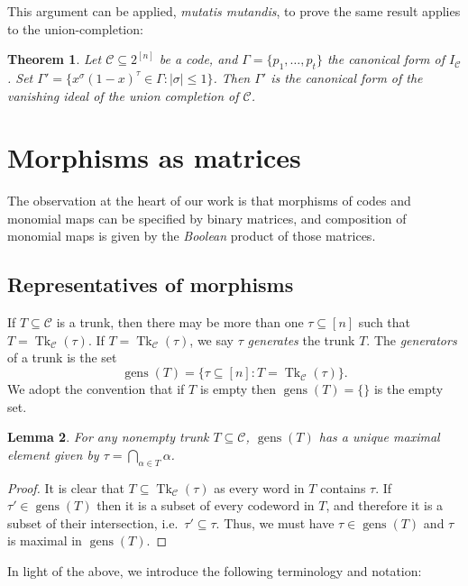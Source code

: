 \documentclass[11pt,letterpaper, reqno]{amsart}
\newtheorem{thm}{Theorem}[section]   %
\newtheorem{lem}[thm]{Lemma}         %
\theoremstyle{definition}
\DeclareMathOperator{\tk}{Tk}
\DeclareMathOperator{\gens}{gens}
\def\cC{\mathcal{C}}
\begin{document}
    This argument can be applied, \emph{mutatis mutandis}, to prove the same result applies to the union-completion:
    \begin{thm}
        Let $\cC \subseteq 2^{[n]}$ be a code, and $\Gamma = \{p_1,\dots,p_t\}$ the canonical form of $I_\cC$. Set $\Gamma' = \{x^\sigma (1-x)^\tau \in \Gamma : |\sigma| \leq 1\}$. Then $\Gamma'$ is the canonical form of the vanishing ideal of the union completion of $\cC$.
    \end{thm}

    
\section{Morphisms as matrices}\label{sec:morphismsasmatrices}
    The observation at the heart of our work is that morphisms of codes and monomial maps can be specified by binary matrices, and composition of monomial maps is given by the \emph{Boolean} product of those matrices.
    
\subsection{Representatives of morphisms}
    If $T \subseteq \cC$ is a trunk, then there may be more than one $\tau \subseteq [n]$ such that $T = \tk_\cC(\tau)$.
    If $T = \tk_\cC(\tau)$, we say $\tau$ \emph{generates} the trunk $T$.
    The \emph{generators} of a trunk is the set
        \[ \gens(T) = \{\tau \subseteq [n] : T = \tk_\cC(\tau)\}. \]
    We adopt the convention that if $T$ is empty then $\gens(T) = \{\}$ is the empty set.
    
    \begin{lem}\label{lem:root}
        For any nonempty trunk $T \subseteq \cC$, $\gens(T)$ has a unique maximal element given by $\tau = \bigcap_{\alpha \in T} \alpha$.
    \end{lem}
    
    \begin{proof}
        It is clear that $T \subseteq \tk_\cC(\tau)$ as every word in $T$ contains $\tau$.
        If $\tau' \in \gens(T)$ then it is a subset of every codeword in $T$, and therefore it is a subset of their intersection, i.e.\ $\tau' \subseteq \tau$.
        Thus, we must have $\tau \in \gens(T)$ and $\tau$ is maximal in $\gens(T)$.
    \end{proof}
    
    In light of the above, we introduce the following terminology and notation:
    
\end{document}
